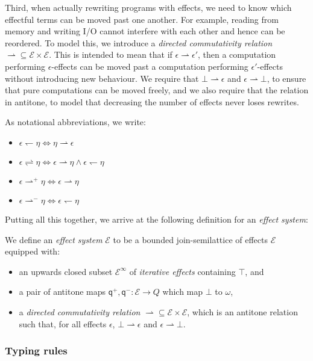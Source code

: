 \documentclass[acmsmall,screen,review]{acmart}
\newcommand{\mc}[1]{\ensuremath{\mathcal{#1}}}
\newcommand{\ms}[1]{\ensuremath{\mathsf{#1}}}
\newcommand{\rightmove}{\rightharpoonup}
\newcommand{\leftmove}{\leftharpoondown}
\newcommand{\slides}{\rightleftharpoons}
\newcommand{\topq}{\omega}
\newcommand{\alquant}{\ms{q}}
\begin{document}
Third, when actually rewriting programs with effects, we need to know which effectful terms can be
moved past one another. For example, reading from memory and writing I/O cannot interfere with each
other and hence can be reordered. To model this, we introduce a \emph{directed commutativity
relation} $\rightmove \subseteq \mc{E} \times \mc{E}$. This is intended to mean that if $\epsilon
\rightmove \epsilon'$, then a computation performing $\epsilon$-effects can be moved past a
computation performing $\epsilon'$-effects without introducing new behaviour. We require that $\bot
\rightmove \epsilon$ and $\epsilon \rightmove \bot$, to ensure that pure computations can be moved
freely, and we also require that the relation in antitone, to model that decreasing the number of
effects never loses rewrites. 

As notational abbreviations, we write:
\begin{itemize}
  \item $\epsilon \leftmove \eta \iff \eta \rightmove \epsilon$
  \item $\epsilon \slides \eta \iff \epsilon \rightmove \eta \land \epsilon \leftmove \eta$
  \item $\epsilon \rightmove^+ \eta \iff \epsilon \rightmove \eta$
  \item $\epsilon \rightmove^- \eta \iff \epsilon \leftmove \eta$
\end{itemize}

Putting all this together, we arrive at the following definition for an
\emph{effect system}:
\begin{definition}
  We define an \emph{effect system} $\mc{E}$ to be a bounded join-semilattice of effects $\mc{E}$
  equipped with:
  \begin{itemize}
  \item an upwards closed subset $\mc{E}^\infty$ of \emph{iterative effects} containing $\top$, and
  \item a pair of antitone maps $\alquant^+, \alquant^- : \mc{E} \to Q$ which map $\bot$ to $\topq$,
  \item a \emph{directed commutativity relation} $\rightmove \subseteq \mc{E} \times \mc{E}$,
  which is an antitone relation   such that, for all effects
  $\epsilon$, $\bot \rightmove \epsilon$ and $\epsilon \rightmove \bot$. 
  \end{itemize}

\end{definition}


\subsubsection{Typing rules}
\end{document}
